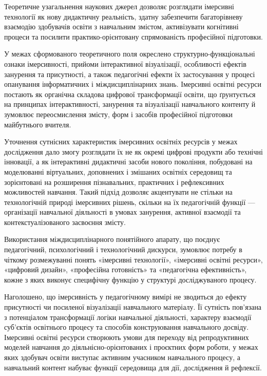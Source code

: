 Теоретичне узагальнення наукових джерел дозволяє розглядати імерсивні технології як нову дидактичну реальність, здатну забезпечити багаторівневу взаємодію здобувачів освіти з навчальним змістом, активізувати когнітивні процеси та посилити практико-орієнтовану спрямованість професійної підготовки.

У межах сформованого теоретичного поля окреслено структурно-функціональні ознаки імерсивності, прийоми інтерактивної візуалізації, особливості ефектів занурення та присутності, а також педагогічні ефекти їх застосування у процесі опанування інформатичних і міждисциплінарних знань. Імерсивні освітні ресурси постають як органічна складова цифрової трансформації освіти, що ґрунтується на принципах інтерактивності, занурення та візуалізації навчального контенту й зумовлює переосмислення змісту, форм і засобів професійної підготовки майбутнього вчителя.

Уточнення сутнісних характеристик імерсивних освітніх ресурсів у межах дослідження дало змогу розглядати їх не як окремі цифрові продукти або технічні інновації, а як інтерактивні дидактичні засоби нового покоління, побудовані на моделюванні віртуальних, доповнених і змішаних освітніх середовищ та зорієнтовані на розширення пізнавальних, практичних і рефлексивних можливостей навчання. Такий підхід дозволяє акцентувати не стільки на технологічній природі імерсивних рішень, скільки на їх педагогічній функції --- організації навчальної діяльності в умовах занурення, активної взаємодії та контекстуалізованого засвоєння змісту.

Використання міждисциплінарного понятійного апарату, що поєднує педагогічний, психологічний і технологічний дискурси, зумовлює потребу в чіткому розмежуванні понять «імерсивні технології», «імерсивні освітні ресурси», «цифровий дизайн», «професійна готовність» та «педагогічна ефективність», кожне з яких виконує специфічну функцію у структурі досліджуваного процесу.

Наголошено, що імерсивність у педагогічному вимірі не зводиться до ефекту присутності чи посиленої візуалізації навчального матеріалу. Її сутність пов'язана з потенціалом трансформації логіки навчальної діяльності, характеру взаємодії суб'єктів освітнього процесу та способів конструювання навчального досвіду. Імерсивні освітні ресурси створюють умови для переходу від репродуктивних моделей навчання до діяльнісно-орієнтованих і проєктних форм роботи, у межах яких здобувач освіти виступає активним учасником навчального процесу, а навчальний контент набуває функції середовища для дії, дослідження й рефлексії.


